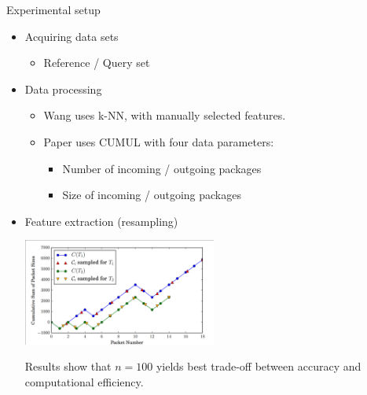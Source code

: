 \documentclass{beamer}
\begin{document}
\begin{frame}{Experimental setup}
\begin{itemize}
\item Acquiring data sets
\begin{itemize}
\item Reference / Query set
\end{itemize}

\item Data processing
\begin{itemize}
\item Wang uses k-NN, with manually selected features.
\item Paper uses CUMUL with four data parameters:
\begin{itemize}
\item Number of incoming / outgoing packages
\item Size of incoming / outgoing packages
\end{itemize}
\end{itemize}

\item Feature extraction (resampling)
\begin{center}
\includegraphics[width=0.5\textwidth,trim={0.1cm 0 0 0.1cm},clip]{resample}
\end{center}
Results show that $n = 100$ yields best trade-off between accuracy and computational efficiency.

\end{itemize}
\end{frame}

\end{document}
